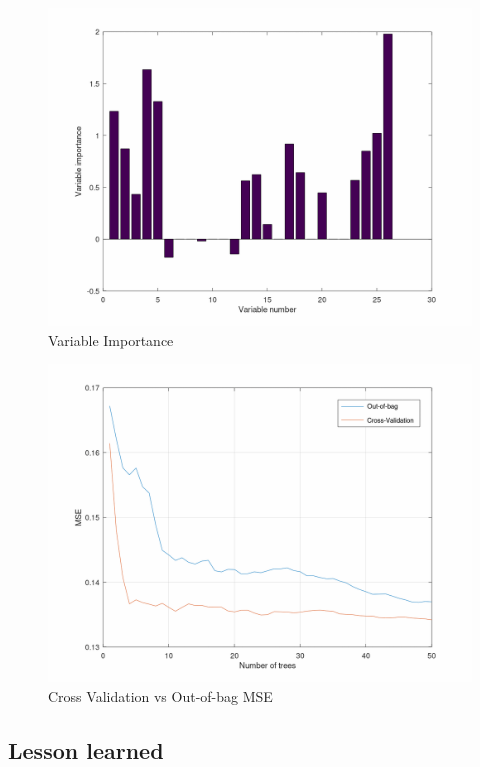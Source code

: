 \documentclass{article}
\begin{document}
\begin{figure}[H]
	\includegraphics[width=\textwidth,height=\textheight,keepaspectratio]{var_importance.png}
	\caption{Variable Importance}
	\label{fig:Var-Importance}
\end{figure}

\begin{figure}[H]
	\includegraphics[width=\textwidth,height=\textheight,keepaspectratio]{bag_vs_cv.png}
	\caption{Cross Validation vs Out-of-bag MSE}
	\label{fig:CV}
\end{figure}
	
\subsection{Lesson learned}
\end{document}

